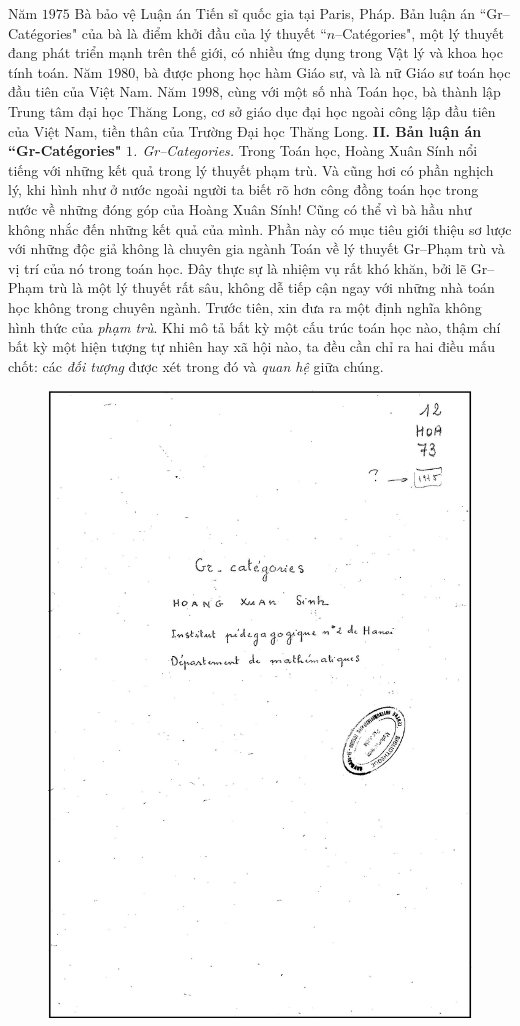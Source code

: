 \begin{multicols}{2}
	\vskip 0.1cm
	Năm $1975$ Bà bảo vệ Luận án Tiến sĩ quốc gia tại Paris, Pháp. Bản luận án ``Gr--Catégories" của bà là điểm khởi đầu của lý thuyết ``$n$--Catégories", một lý thuyết đang phát triển mạnh trên thế giới, có nhiều ứng dụng trong Vật lý và khoa học tính toán. 
	\vskip 0.1cm
	Năm $1980$, bà được phong học hàm Giáo sư, và là nữ Giáo sư toán học đầu tiên của Việt Nam.
	\vskip 0.1cm
	Năm $1998$, cùng với một số nhà Toán học, bà thành lập Trung tâm đại học Thăng Long, cơ sở giáo dục đại học ngoài công lập đầu tiên của Việt Nam, tiền thân của Trường Đại học Thăng Long. 
	\vskip 0.1cm
	\textbf{\color{doisongtoanhoc}II. Bản luận án ``Gr-Catégories" }
	\vskip 0.1cm
	\textit{$1$. Gr--Categories.}
	\vskip 0.1cm
	Trong Toán học, Hoàng Xuân Sính nổi tiếng với những kết quả trong lý thuyết phạm trù. Và cũng hơi có phần nghịch lý, khi hình như ở nước ngoài người ta biết rõ hơn công đồng toán học trong nước về những đóng góp của Hoàng Xuân Sính! Cũng có thể vì bà hầu như không nhắc đến những kết quả của mình.
	\vskip 0.1cm
	Phần này có mục tiêu giới thiệu sơ lược với những độc giả không là chuyên gia ngành Toán về lý thuyết Gr--Phạm trù và vị trí của nó trong toán học. Đây thực sự là nhiệm vụ rất khó khăn, bởi lẽ Gr--Phạm trù là một lý thuyết rất sâu, không dễ tiếp cận ngay với những nhà toán học không trong chuyên ngành.  
	\vskip 0.1cm
	Trước tiên, xin đưa ra một định nghĩa không hình thức của \textit{phạm trù}.
	Khi mô tả bất kỳ một cấu trúc toán học nào, thậm chí bất kỳ một hiện tượng tự nhiên hay xã hội nào, ta đều cần chỉ ra hai điều mấu chốt: các \textit{đối tượng} được xét trong đó và \textit{quan hệ} giữa chúng.  
	\begin{figure}[H]
		\vspace*{-5pt}
		\centering
		\captionsetup{labelformat= empty, justification=centering}
		\includegraphics[height= 0.72\linewidth]{Anh21}

\end{figure}
\end{multicols}
